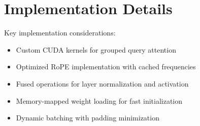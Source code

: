 \documentclass[11pt,a4paper]{article}
\begin{document}
\section{Implementation Details}

Key implementation considerations:
\begin{itemize}
    \item Custom CUDA kernels for grouped query attention
    \item Optimized RoPE implementation with cached frequencies
    \item Fused operations for layer normalization and activation
    \item Memory-mapped weight loading for fast initialization
    \item Dynamic batching with padding minimization
\end{itemize}
\end{document}
